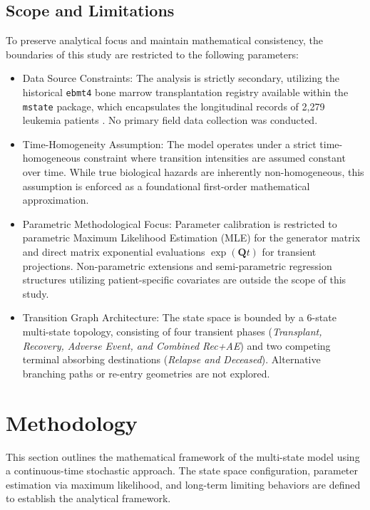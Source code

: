 \documentclass[9pt,a4paper,twocolumn,twoside]{rho-class/rho}
\begin{document}
    \subsection{Scope and Limitations}
    To preserve analytical focus and maintain mathematical consistency, the boundaries of this study are restricted to the following parameters:
    \begin{itemize}
        \item Data Source Constraints: The analysis is strictly secondary, utilizing the historical \texttt{ebmt4} bone marrow transplantation registry available within the \texttt{mstate} package, which encapsulates the longitudinal records of 2,279 leukemia patients \cite{dewreede2011mstate}. No primary field data collection was conducted.
        
        \item Time-Homogeneity Assumption: The model operates under a strict time-homogeneous constraint where transition intensities are assumed constant over time. While true biological hazards are inherently non-homogeneous, this assumption is enforced as a foundational first-order mathematical approximation.
        
        \item Parametric Methodological Focus: Parameter calibration is restricted to parametric Maximum Likelihood Estimation (MLE) for the generator matrix and direct matrix exponential evaluations $\exp(\mathbf{Q}t)$ for transient projections. Non-parametric extensions and semi-parametric regression structures utilizing patient-specific covariates are outside the scope of this study.
        
        \item Transition Graph Architecture: The state space is bounded by a 6-state multi-state topology, consisting of four transient phases (\textit{Transplant, Recovery, Adverse Event, and Combined Rec+AE}) and two competing terminal absorbing destinations (\textit{Relapse and Deceased}). Alternative branching paths or re-entry geometries are not explored.
    \end{itemize}

\section{Methodology}

    This section outlines the mathematical framework of the multi-state model using a continuous-time stochastic approach. The state space configuration, parameter estimation via maximum likelihood, and long-term limiting behaviors are defined to establish the analytical framework.
\end{document}
